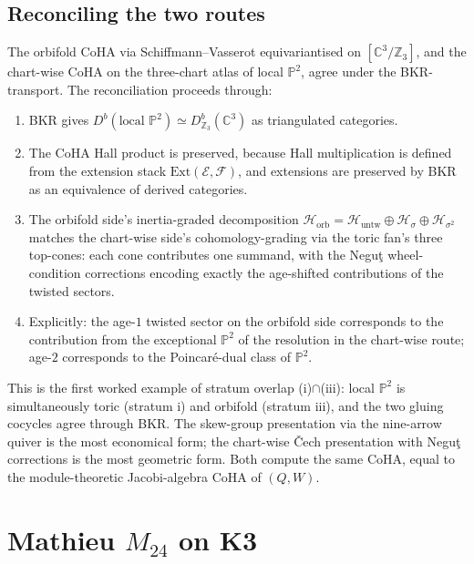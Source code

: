 \subsection{Reconciling the two routes}
\label{subsec:reconcile-p2}

The orbifold CoHA via Schiffmann--Vasserot equivariantised on $[\mathbb{C}^3/\mathbb{Z}_3]$, and the chart-wise CoHA on the three-chart atlas of local $\mathbb{P}^2$, agree under the BKR-transport. The reconciliation proceeds through:
\begin{enumerate}
  \item BKR gives $D^b(\text{local } \mathbb{P}^2) \simeq D^b_{\mathbb{Z}_3}(\mathbb{C}^3)$ as triangulated categories.
  \item The CoHA Hall product is preserved, because Hall multiplication is defined from the extension stack $\mathrm{Ext}(\mathcal{E}, \mathcal{F})$, and extensions are preserved by BKR as an equivalence of derived categories.
  \item The orbifold side's inertia-graded decomposition $\mathcal{H}_{\mathrm{orb}} = \mathcal{H}_{\mathrm{untw}} \oplus \mathcal{H}_{\sigma} \oplus \mathcal{H}_{\sigma^2}$ matches the chart-wise side's cohomology-grading via the toric fan's three top-cones: each cone contributes one summand, with the Negu\c{t} wheel-condition corrections encoding exactly the age-shifted contributions of the twisted sectors.
  \item Explicitly: the age-$1$ twisted sector on the orbifold side corresponds to the contribution from the exceptional $\mathbb{P}^2$ of the resolution in the chart-wise route; age-$2$ corresponds to the Poincar\'e-dual class of $\mathbb{P}^2$.
\end{enumerate}

This is the first worked example of stratum overlap (i)$\cap$(iii): local $\mathbb{P}^2$ is simultaneously toric (stratum i) and orbifold (stratum iii), and the two gluing cocycles agree through BKR. The skew-group presentation via the nine-arrow quiver is the most economical form; the chart-wise \v{C}ech presentation with Negu\c{t} corrections is the most geometric form. Both compute the same CoHA, equal to the module-theoretic Jacobi-algebra CoHA of $(Q, W)$.

\section{Mathieu \texorpdfstring{$M_{24}$}{M24} on K3}
\label{sec:mathieu-m24}

